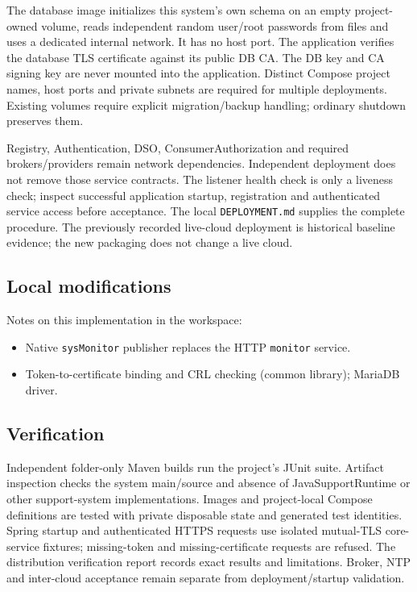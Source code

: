 \documentclass[a4paper]{arrowhead}
\begin{document}
The database image initializes this system's own schema on an empty project-owned volume, reads independent random user/root passwords from files and uses a dedicated internal network. It has no host port. The application verifies the database TLS certificate against its public DB CA. The DB key and CA signing key are never mounted into the application. Distinct Compose project names, host ports and private subnets are required for multiple deployments. Existing volumes require explicit migration/backup handling; ordinary shutdown preserves them.

Registry, Authentication, DSO, ConsumerAuthorization and required brokers/providers remain network dependencies. Independent deployment does not remove those service contracts. The listener health check is only a liveness check; inspect successful application startup, registration and authenticated service access before acceptance. The local \texttt{DEPLOYMENT.md} supplies the complete procedure. The previously recorded live-cloud deployment is historical baseline evidence; the new packaging does not change a live cloud.

\subsection{Local modifications}
\label{sec:local}

Notes on this implementation in the workspace:
\begin{itemize}
  \item Native \texttt{sysMonitor} publisher replaces the HTTP \texttt{monitor} service.
  \item Token-to-certificate binding and CRL checking (common library); MariaDB driver.
\end{itemize}

\subsection{Verification}

Independent folder-only Maven builds run the project's JUnit suite. Artifact inspection checks the system main/source and absence of JavaSupportRuntime or other support-system implementations. Images and project-local Compose definitions are tested with private disposable state and generated test identities. Spring startup and authenticated HTTPS requests use isolated mutual-TLS core-service fixtures; missing-token and missing-certificate requests are refused. The distribution verification report records exact results and limitations. Broker, NTP and inter-cloud acceptance remain separate from deployment/startup validation.
\end{document}
